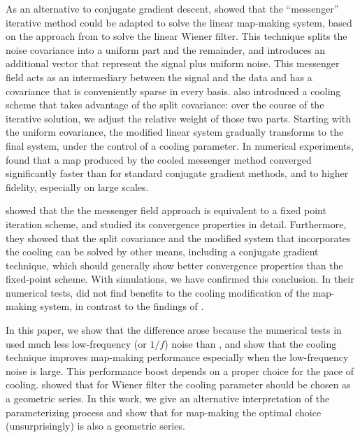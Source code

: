 \documentclass[twocolumn,linenumbers]{aastex631}
\begin{document}
\begin{CJK*}{UTF8}{gbsn}
As an alternative to conjugate gradient descent, \citet{Huffenberger_2018} showed that the ``messenger'' iterative method could be adapted to solve the linear map-making system, based on the  approach from \cite{2013A&A...549A.111E} to solve the linear Wiener filter.
This technique splits the noise covariance into a uniform part and the remainder, and introduces an additional vector that represent the signal plus uniform noise.
This messenger field acts as an intermediary between the signal and the data and has a covariance that is conveniently sparse in every basis.
\cite{2013A&A...549A.111E} also introduced a cooling scheme that takes advantage of the split covariance: over the course of the iterative solution, we adjust the relative weight of those two parts.  Starting with the uniform covariance, the modified linear system gradually transforms to the final system, under the control of a cooling parameter.  In numerical experiments, \citet{Huffenberger_2018} found that a map produced by the cooled messenger method converged significantly faster than for standard conjugate gradient methods, and to higher fidelity, especially on large scales.  

\citet{2018A&A...620A..59P} showed that the the messenger field approach is equivalent to a fixed point iteration scheme, and studied its convergence properties in detail.  Furthermore, they showed that the split covariance and the modified system that incorporates the cooling can be solved by other means, including a conjugate gradient technique, which should generally show better convergence properties than the fixed-point scheme.
With simulations, we have confirmed  this conclusion.
In their numerical tests, \citet{2018A&A...620A..59P} did not find benefits to the cooling modification of the map-making system, in contrast to the findings of \citet{Huffenberger_2018}.

In this paper, we show that the difference arose because the numerical tests in \citet{2018A&A...620A..59P} used much less low-frequency (or $1/f$) noise than \citet{Huffenberger_2018}, and show that the cooling technique improves map-making performance especially when the low-frequency noise is large.  This performance boost depends on a proper choice for the pace of cooling.  \citet{2017MNRAS.468.1782K} showed that for Wiener filter the cooling parameter should be chosen as a geometric series.  In this work, we give an alternative interpretation of the parameterizing process and show that for map-making the optimal choice (unsurprisingly) is also a geometric series.



\end{CJK*}
\end{document}
